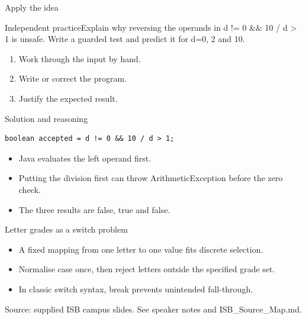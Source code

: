\documentclass[10pt,aspectratio=169]{beamer}
\begin{document}
\begin{frame}[fragile,t]{Apply the idea}
\begin{alertblock}{Independent practice}Explain why reversing the operands in d != 0 \&\& 10 / d \textgreater{} 1 is unsafe. Write a guarded test and predict it for d=0, 2 and 10.\end{alertblock}\vspace{3mm}\begin{enumerate}\item Work through the input by hand.\item Write or correct the program.\item Justify the expected result.\end{enumerate}
\end{frame}

\begin{frame}[fragile,t]{Solution and reasoning}
\begin{lstlisting}
boolean accepted = d != 0 && 10 / d > 1;
\end{lstlisting}\vspace{1mm}\small\begin{itemize}
\item Java evaluates the left operand first.
\item Putting the division first can throw ArithmeticException before the zero check.
\item The three results are false, true and false.
\end{itemize}
\end{frame}

\begin{frame}[fragile,t]{Letter grades as a switch problem}
\begin{itemize}
\item A fixed mapping from one letter to one value fits discrete selection.
\item Normalise case once, then reject letters outside the specified grade set.
\item In classic switch syntax, break prevents unintended fall{-}through.
\end{itemize}
\vspace{3mm}\footnotesize\textcolor{accent}{Source: supplied ISB campus slides. See speaker notes and ISB\_Source\_Map.md.}
\end{frame}
\end{document}
